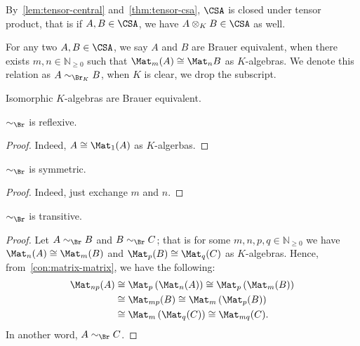 \begin{remark}
  By~\cref{lem:tensor-central} and~\cref{thm:tensor-csa}, $\CSA$ is closed under tensor product, that is if $A, B\in\CSA$, we have $A\otimes_{K} B\in\CSA$ as well.
\end{remark}

\begin{definition}\label{def:br-eqv}
  For any two $A, B\in\CSA$, we say $A$ and $B$ are Brauer equivalent, when there exists $m, n \in \mathbb{N}_{\ge0}$ such that $\Mat_{m}(A)\cong \Mat_{n}B$ as $K$-algebras. We denote this relation as $A\sim_{\Br_{K}} B$, when $K$ is clear, we drop the subscript.
\end{definition}

\begin{remark}
  Isomorphic $K$-algebras are Brauer equivalent.
\end{remark}

\begin{lemma}
  $\sim_{\Br}$ is reflexive.
  \leanok
\end{lemma}
\begin{proof}
  Indeed, $A \cong \Mat_{1}(A)$ as $K$-algerbas.
\end{proof}

\begin{lemma}
  $\sim_{\Br}$ is symmetric.
  \leanok
\end{lemma}
\begin{proof}
  Indeed, just exchange $m$ and $n$.
\end{proof}

\begin{lemma}
  $\sim_{\Br}$ is transitive.
  \leanok
\end{lemma}
\begin{proof}
  Let $A\sim_{\Br}B$ and $B\sim_{\Br}C$; that is for some $m,n,p, q\in\mathbb{N}_{\ge0}$ we have $\Mat_{n}(A)\cong\Mat_{m}(B)$ and $\Mat_{p}(B)\cong \Mat_{q}(C)$ as $K$-algebras. Hence, from~\cref{con:matrix-matrix}, we have the following:
  \[
    \begin{aligned}
      \Mat_{np}(A)&\cong \Mat_{p}\left(\Mat_{n}(A)\right)\cong\Mat_{p}\left(\Mat_{m}(B)\right)\\
                  &\cong\Mat_{mp}(B)\cong\Mat_{m}\left(\Mat_{p}(B)\right)\\
      &\cong\Mat_{m}\left(\Mat_{q}(C)\right)\cong\Mat_{mq}(C).
    \end{aligned}
  \]
  In another word, $A\sim_{\Br}C$.
\end{proof}

